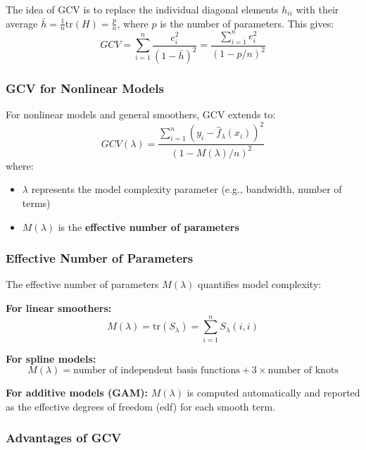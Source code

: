 \documentclass[12pt,a4paper]{article}
\begin{document}
The idea of GCV is to replace the individual diagonal elements $h_{ii}$ with their average $\bar{h} = \frac{1}{n}\text{tr}(H) = \frac{p}{n}$, where $p$ is the number of parameters. This gives:
\begin{equation}
GCV = \sum_{i=1}^n \frac{e_i^2}{(1 - \bar{h})^2} = \frac{\sum_{i=1}^n e_i^2}{(1 - p/n)^2}
\end{equation}

\subsubsection{GCV for Nonlinear Models}

For nonlinear models and general smoothers, GCV extends to:
\begin{equation}
GCV(\lambda) = \frac{\sum_{i=1}^n (y_i - \hat{f}_\lambda(x_i))^2}{(1 - M(\lambda)/n)^2}
\end{equation}
where:
\begin{itemize}
    \item $\lambda$ represents the model complexity parameter (e.g., bandwidth, number of terms)
    \item $M(\lambda)$ is the \textbf{effective number of parameters}
\end{itemize}

\subsubsection{Effective Number of Parameters}

The effective number of parameters $M(\lambda)$ quantifies model complexity:

\textbf{For linear smoothers:}
\begin{equation}
M(\lambda) = \text{tr}(S_\lambda) = \sum_{i=1}^n S_\lambda(i,i)
\end{equation}

\textbf{For spline models:}
\begin{equation}
M(\lambda) = \text{number of independent basis functions} + 3 \times \text{number of knots}
\end{equation}

\textbf{For additive models (GAM):} $M(\lambda)$ is computed automatically and reported as the effective degrees of freedom (edf) for each smooth term.

\subsubsection{Advantages of GCV}
\end{document}

